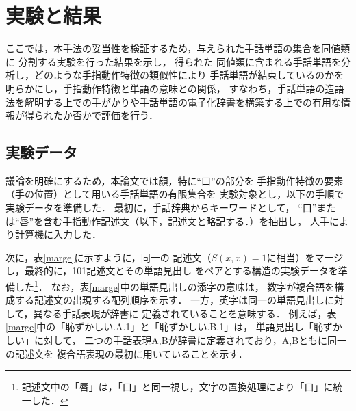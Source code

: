 \section {実験と結果}

ここでは，本手法の妥当性を検証するため，与えられた手話単語の集合を同値類に
分割する実験を行った結果を示し，
得られた
同値類に含まれる手話単語を分析し，どのような手指動作特徴の類似性により
手話単語が結束しているのかを明らかにし，手指動作特徴と単語の意味との関係，
すなわち，手話単語の造語法を解明する上での手がかりや手話単語の電子化辞書を構築する上での有用な情報が得られたか否かで評価を行う．

\subsection {実験データ}\label{pre}

議論を明確にするため，本論文では顔，特に``口''の部分を
手指動作特徴の要素（手の位置）として用いる手話単語の有限集合を
実験対象とし，以下の手順で実験データを準備した．
最初に，手話辞典\cite{MaruyamaKoji1984}からキーワードとして，
``口''または``唇''を含む手指動作記述文（以下，記述文と略記する．）を抽出し，
人手により計算機に入力した．

次に，表\ref{marge}に示すように，同一の
記述文（$S(x,x) = 1$に相当）をマージし，最終的に，101記述文とその単語見出し
をペアとする構造の実験データを準備した\footnote{記述文中の「唇」は，「口」と同一視し，文字の置換処理により「口」に統一した．}．
なお，表\ref{marge}中の単語見出しの添字の意味は，
数字が複合語を構成する記述文の出現する配列順序を示す．
一方，英字は同一の単語見出しに対して，異なる手話表現が辞書に
定義されていることを意味する．
例えば，表\ref{marge}中の「恥ずかしい.A.1」と「恥ずかしい.B.1」は，
単語見出し「恥ずかしい」に対して，
二つの手話表現A,Bが辞書に定義されており，A,Bともに同一の記述文を
複合語表現の最初に用いていることを示す．

